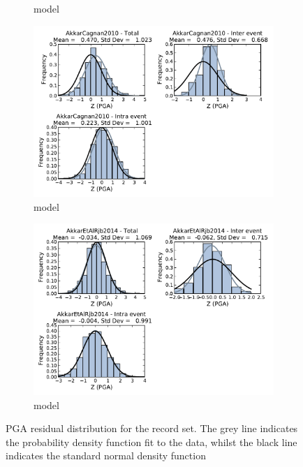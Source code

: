 \begin{figure}[htb]
\begin{subfigure}[b]{0.49\textwidth}
      \caption{\cite{AkkarBommer2010} model}
      \label{fig:pga_res_ab2010}
  \end{subfigure}
    \begin{subfigure}[b]{0.49\textwidth}
      \includegraphics[width=\textwidth]{./figures/residuals/AC2010_Residuals_PGA.pdf}
      \caption{\cite{AkkarCagnan2010} model}
      \label{fig:pga_res_ac2010}
  \end{subfigure}
      \begin{subfigure}[b]{0.49\textwidth}
      \includegraphics[width=\textwidth]{./figures/residuals/Akkar2014_Residuals_PGA.pdf}
     \caption{\cite{Akkar_etal2014}model}
      \label{fig:pga_res_akkar2014}
  \end{subfigure}
  \caption{PGA residual distribution for the record set. The grey line indicates the probability density function fit to the data, whilst the black line indicates the standard normal density function}
  \label{fig:pga_resids}
\end{figure}

